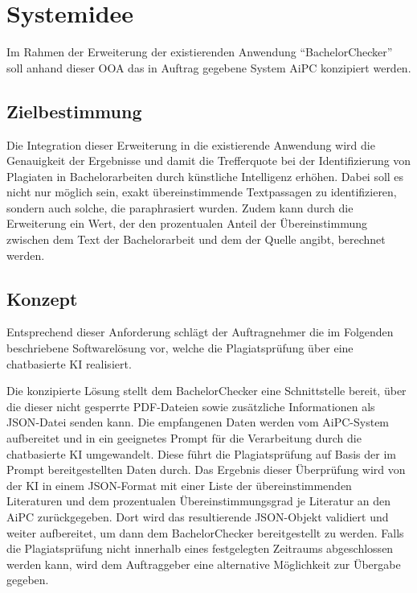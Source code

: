 \chapter{Systemidee}\label{ch:systemidee}

Im Rahmen der Erweiterung der existierenden Anwendung “BachelorChecker” soll anhand dieser \ac{OOA} das in Auftrag gegebene System \ac{AiPC} konzipiert werden.


\section{Zielbestimmung}\label{sec:zielbestimmung}

Die Integration dieser Erweiterung in die existierende Anwendung wird die Genauigkeit der Ergebnisse und damit die Trefferquote bei der Identifizierung von Plagiaten in Bachelorarbeiten durch künstliche Intelligenz erhöhen.
Dabei soll es nicht nur möglich sein, exakt übereinstimmende Textpassagen zu identifizieren, sondern auch solche, die paraphrasiert wurden.
Zudem kann durch die Erweiterung ein Wert, der den prozentualen Anteil der Übereinstimmung zwischen dem Text der Bachelorarbeit und dem der Quelle angibt, berechnet werden.


\section{Konzept}\label{sec:konzept}

Entsprechend dieser Anforderung schlägt der Auftragnehmer die im Folgenden beschriebene Softwarelösung vor, welche die Plagiatsprüfung über eine chatbasierte KI realisiert.

Die konzipierte Lösung stellt dem BachelorChecker eine Schnittstelle bereit, über die dieser nicht gesperrte \ac{PDF}-Dateien sowie zusätzliche Informationen als \ac{JSON}-Datei senden kann.
Die empfangenen Daten werden vom \ac{AiPC}-System aufbereitet und in ein geeignetes Prompt für die Verarbeitung durch die chatbasierte \ac{KI} umgewandelt.
Diese führt die Plagiatsprüfung auf Basis der im Prompt bereitgestellten Daten durch.
Das Ergebnis dieser Überprüfung wird von der \ac{KI} in einem JSON-Format mit einer Liste der übereinstimmenden Literaturen und dem prozentualen Übereinstimmungsgrad je Literatur an den \ac{AiPC} zurückgegeben.
Dort wird das resultierende \ac{JSON}-Objekt validiert und weiter aufbereitet, um dann dem BachelorChecker bereitgestellt zu werden.
Falls die Plagiatsprüfung nicht innerhalb eines festgelegten Zeitraums abgeschlossen werden kann, wird dem Auftraggeber eine alternative Möglichkeit zur Übergabe gegeben.


